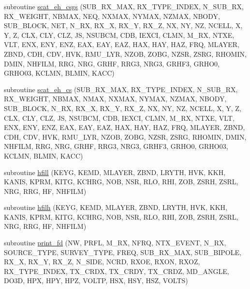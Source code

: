 \begin{DoxyCompactItemize}
\item 
subroutine \hyperlink{Marco_8f90_a343a057778b6701b550f9b257d626981}{scat\+\_\+eh\+\_\+csgs} (S\+U\+B\+\_\+\+R\+X\+\_\+\+M\+AX, R\+X\+\_\+\+T\+Y\+P\+E\+\_\+\+I\+N\+D\+EX, N\+\_\+\+S\+U\+B\+\_\+\+RX, R\+X\+\_\+\+W\+E\+I\+G\+HT, N\+B\+M\+AX, N\+EQ, N\+X\+M\+AX, N\+Y\+M\+AX, N\+Z\+M\+AX, N\+B\+O\+DY, S\+U\+B\+\_\+\+B\+L\+O\+CK, N\+ET, N\+\_\+\+RX, R\+X\+\_\+X, R\+X\+\_\+Y, R\+X\+\_\+Z, NX, NY, NZ, N\+C\+E\+LL, X, Y, Z, C\+LX, C\+LY, C\+LZ, JS, N\+S\+U\+B\+CM, C\+DB, I\+E\+X\+CI, C\+L\+MN, M\+\_\+\+RX, N\+T\+XE, V\+LT, E\+NX, E\+NY, E\+NZ, E\+AX, E\+AY, E\+AZ, H\+AX, H\+AY, H\+AZ, F\+RQ, M\+L\+A\+Y\+ER, Z\+B\+ND, C\+DH, C\+DV, H\+VK, R\+M\+U\+\_\+\+L\+YR, N\+Z\+OB, Z\+O\+BG, N\+Z\+SR, Z\+S\+RG, R\+H\+O\+M\+IN, D\+M\+IN, N\+H\+F\+I\+LM, R\+RG, N\+RG, G\+R\+HF, R\+R\+G3, N\+R\+G3, G\+R\+H\+F3, G\+R\+H\+O0, G\+R\+H\+O03, K\+C\+L\+MN, B\+L\+M\+IN, K\+A\+CC)
\item 
subroutine \hyperlink{Marco_8f90_ab114795afedfc64f5732cc167cf0861a}{scat\+\_\+eh\+\_\+cs} (S\+U\+B\+\_\+\+R\+X\+\_\+\+M\+AX, R\+X\+\_\+\+T\+Y\+P\+E\+\_\+\+I\+N\+D\+EX, N\+\_\+\+S\+U\+B\+\_\+\+RX, R\+X\+\_\+\+W\+E\+I\+G\+HT, N\+B\+M\+AX, N\+M\+AX, N\+X\+M\+AX, N\+Y\+M\+AX, N\+Z\+M\+AX, N\+B\+O\+DY, S\+U\+B\+\_\+\+B\+L\+O\+CK, N\+\_\+\+RX, R\+X\+\_\+X, R\+X\+\_\+Y, R\+X\+\_\+Z, NX, NY, NZ, N\+C\+E\+LL, X, Y, Z, C\+LX, C\+LY, C\+LZ, JS, N\+S\+U\+B\+CM, C\+DB, I\+E\+X\+CI, C\+L\+MN, M\+\_\+\+RX, N\+T\+XE, V\+LT, E\+NX, E\+NY, E\+NZ, E\+AX, E\+AY, E\+AZ, H\+AX, H\+AY, H\+AZ, F\+RQ, M\+L\+A\+Y\+ER, Z\+B\+ND, C\+DH, C\+DV, H\+VK, R\+M\+U\+\_\+\+L\+YR, N\+Z\+OB, Z\+O\+BG, N\+Z\+SR, Z\+S\+RG, R\+H\+O\+M\+IN, D\+M\+IN, N\+H\+F\+I\+LM, R\+RG, N\+RG, G\+R\+HF, R\+R\+G3, N\+R\+G3, G\+R\+H\+F3, G\+R\+H\+O0, G\+R\+H\+O03, K\+C\+L\+MN, B\+L\+M\+IN, K\+A\+CC)
\item 
subroutine \hyperlink{Marco_8f90_a480d736c8998d27f049a30b17c5abb11}{hfill} (K\+E\+YG, K\+E\+MD, M\+L\+A\+Y\+ER, Z\+B\+ND, L\+R\+Y\+TH, H\+VK, K\+KH, K\+A\+N\+IS, K\+P\+RM, K\+I\+TG, K\+C\+H\+RG, N\+OB, N\+SR, R\+LO, R\+HI, Z\+OB, Z\+S\+RH, Z\+S\+RL, N\+RG, R\+RG, HF, N\+H\+F\+I\+LM)
\item 
subroutine \hyperlink{Marco_8f90_a74a15aabfd889793f141e6d8ac9592c4}{hfilh} (K\+E\+YG, K\+E\+MD, M\+L\+A\+Y\+ER, Z\+B\+ND, L\+R\+Y\+TH, H\+VK, K\+KH, K\+A\+N\+IS, K\+P\+RM, K\+I\+TG, K\+C\+H\+RG, N\+OB, N\+SR, R\+LO, R\+HI, Z\+OB, Z\+S\+RH, Z\+S\+RL, N\+RG, R\+RG, HF, N\+H\+F\+I\+LM)
\item 
subroutine \hyperlink{Marco_8f90_ac7754a681e0f0decb7a67b65fffe3745}{print\+\_\+fd} (NW, P\+R\+FL, M\+\_\+\+RX, N\+F\+RQ, N\+T\+X\+\_\+\+E\+V\+E\+NT, N\+\_\+\+RX, S\+O\+U\+R\+C\+E\+\_\+\+T\+Y\+PE, S\+U\+R\+V\+E\+Y\+\_\+\+T\+Y\+PE, F\+R\+EQ, S\+U\+B\+\_\+\+R\+X\+\_\+\+M\+AX, S\+U\+B\+\_\+\+B\+I\+P\+O\+LE, R\+X\+\_\+X, R\+X\+\_\+Y, R\+X\+\_\+Z, N\+\_\+\+S\+I\+DE, N\+C\+RD, R\+X\+OE, R\+X\+ON, R\+X\+OZ, R\+X\+\_\+\+T\+Y\+P\+E\+\_\+\+I\+N\+D\+EX, T\+X\+\_\+\+C\+R\+DX, T\+X\+\_\+\+C\+R\+DY, T\+X\+\_\+\+C\+R\+DZ, M\+D\+\_\+\+A\+N\+G\+LE, D\+O3D, H\+PX, H\+PY, H\+PZ, V\+O\+L\+TP, H\+SX, H\+SY, H\+SZ, V\+O\+L\+TS)
\end{DoxyCompactItemize}
